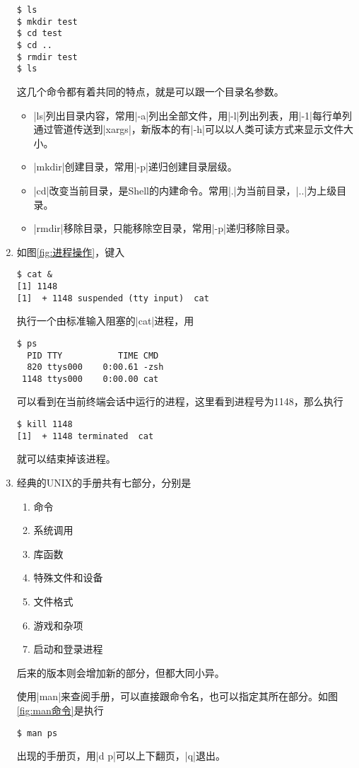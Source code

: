 \documentclass[cs4size,a4paper,nofonts]{ctexart}
\begin{document}
\begin{enumerate}[label={(\arabic*)}]
\begin{Verbatim}
$ ls
$ mkdir test
$ cd test
$ cd ..
$ rmdir test
$ ls
\end{Verbatim}

这几个命令都有着共同的特点，就是可以跟一个目录名参数。

\begin{itemize}
\item |ls|列出目录内容，常用|-a|列出全部文件，用|-l|列出列表，用|-1|每行单列通过管道传送到|xargs|，新版本的有|-h|可以以人类可读方式来显示文件大小。
\item |mkdir|创建目录，常用|-p|递归创建目录层级。
\item |cd|改变当前目录，是Shell的内建命令。常用|.|为当前目录，|..|为上级目录。
\item |rmdir|移除目录，只能移除空目录，常用|-p|递归移除目录。
\end{itemize}

\begin{figure}[htp]
\end{figure}

\item 如图\ref{fig:进程操作}，键入
\begin{Verbatim}
$ cat &
[1] 1148
[1]  + 1148 suspended (tty input)  cat
\end{Verbatim}
执行一个由标准输入阻塞的|cat|进程，用
\begin{Verbatim}
$ ps
  PID TTY           TIME CMD
  820 ttys000    0:00.61 -zsh
 1148 ttys000    0:00.00 cat
\end{Verbatim}
可以看到在当前终端会话中运行的进程，这里看到进程号为1148，那么执行
\begin{Verbatim}
$ kill 1148
[1]  + 1148 terminated  cat
\end{Verbatim}
就可以结束掉该进程。

\item 经典的UNIX的手册共有七部分，分别是
\begin{enumerate}[label={\arabic*.}]
\item 命令
\item 系统调用
\item 库函数
\item 特殊文件和设备
\item 文件格式
\item 游戏和杂项
\item 启动和登录进程
\end{enumerate}
后来的版本则会增加新的部分，但都大同小异。

使用|man|来查阅手册，可以直接跟命令名，也可以指定其所在部分。如图\ref{fig:man命令}是执行
\begin{Verbatim}
$ man ps
\end{Verbatim}
出现的手册页，用|d p|可以上下翻页，|q|退出。


\end{enumerate}
\end{document}
